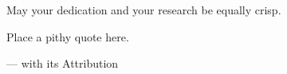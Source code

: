 
\vspace{3\baselineskip}
\begin{center}
{\small
May your dedication and your research be equally crisp.
}
\end{center}
\clearpage

\epigraph{
Place a pithy quote here.}{--- with its Attribution}

